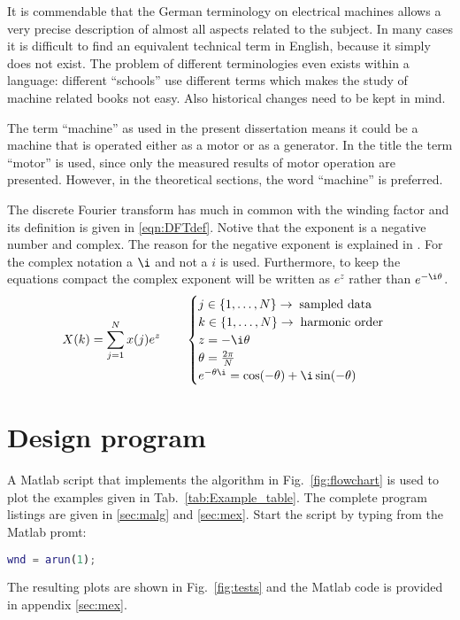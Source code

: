 It is commendable that the German terminology on electrical machines allows a very precise description of almost all aspects related to the subject. In many cases it is difficult to find an equivalent technical term in English, because it simply does not exist. The problem of different terminologies even exists within a language: different ``schools'' use different terms which makes the study of machine related books not easy. Also historical changes need to be kept in mind.

The term ``machine'' as used in the present dissertation means it could be a machine that is operated either as a motor or as a generator. In the title the term ``motor'' is used, since only the measured results of motor operation are presented. However, in the theoretical sections, the word ``machine'' is preferred.  

The discrete Fourier transform has much in common with the winding factor and its definition is given in \eqref{eqn:DFTdef}. Notive that the exponent is a negative number and complex. The reason for the negative exponent is explained in \cite{REF-01048,REF-01049,REF-01050}. For the complex notation a $\i$ and not a $i$ is used. Furthermore, to keep the equations compact the complex exponent will be written as $e^z$ rather than $e^{-\i\theta}$.
\begin{equation}\label{eqn:DFTdef}
  X(k)=\sum_{j=1}^{N}x(j)e^z
  \qquad
  \begin{cases}
    j \in \left\{1,\ldots,N  \right\} \rightarrow \; \mbox{sampled data}\\
  	k \in \left\{1,\ldots,N  \right\} \rightarrow \; \mbox{harmonic order}\\
    z = -\i\theta   \\
  	\theta = \frac{2\pi}{N}   \\
  	e^{-\theta \i} = \cos (-\theta) + \i \sin (-\theta)
  \end{cases}
\end{equation}

\section{Design program}
A Matlab script that implements the algorithm in Fig.~\ref{fig:flowchart} is used to plot the examples given in Tab.~\ref{tab:Example_table}. The complete program listings are given in \ref{sec:malg} and \ref{sec:mex}. Start the script by typing from the Matlab promt:

\begin{lstlisting}[language=matlab]
wnd = arun(1);
\end{lstlisting}
The resulting plots are shown in Fig.~\ref{fig:tests} and the Matlab code is provided in appendix \ref{sec:mex}.

